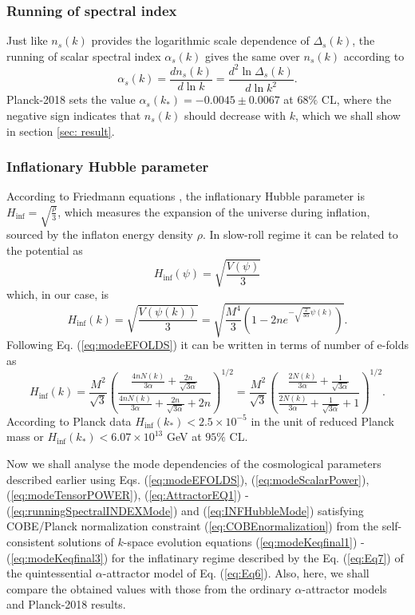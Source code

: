 \documentclass[a4paper,11pt]{article}
\begin{document}
\subsubsection{Running of spectral index}
Just like $n_s(k)$ provides the logarithmic scale dependence of $\Delta_s(k)$, the running of scalar spectral index $\alpha_s(k)$ gives the same over $n_s(k)$ according to
\begin{equation}
    \alpha_s(k) =\frac{dn_s(k)}{d\ln{k}}=\frac{d^2\ln{\Delta_s(k)}}{d\ln{k}^2}.
    \label{eq:runningSpectralINDEXMode}
\end{equation}
Planck-2018 sets the value $\alpha_s(k_{*})=-0.0045\pm 0.0067$ at $68\%$ CL, where the negative sign indicates that $n_s(k)$ should decrease with $k$, which we shall show in section \ref{sec: result}.
\subsubsection{Inflationary Hubble parameter}
According to Friedmann equations \cite{Baumann:2009ds}, the inflationary Hubble parameter is $H_{\mathrm{inf}}=\sqrt{\frac{\rho}{3}}$, which measures the expansion of the universe during inflation, sourced by the inflaton energy density $\rho$. In slow-roll regime it can be related to the potential as
\begin{equation}
    H_{\mathrm{inf}}(\psi) = \sqrt{\frac{V(\psi)}{3}}
\end{equation} which, in our case, is
\begin{equation}
   H_{\mathrm{inf}}(k) =\sqrt{\frac{V(\psi(k))}{3}}=\sqrt{\frac{M^4}{3}\left(1-2ne^{-\sqrt{\frac{2}{3\alpha}}\psi(k)}\right)}.
   \label{eq:DefHubbleINF}
\end{equation}
Following Eq. (\ref{eq:modeEFOLDS}) it can be written in terms of number of e-folds as
\begin{equation}
    H_{\mathrm{inf}}(k)=\frac{M^2}{\sqrt{3}}\left(\frac{\frac{4nN(k)}{3\alpha}+\frac{2n}{\sqrt{3\alpha}}}{\frac{4nN(k)}{3\alpha}+\frac{2n}{\sqrt{3\alpha}}+2n}\right)^{1/2}=\frac{M^2}{\sqrt{3}}\left(\frac{\frac{2N(k)}{3\alpha}+\frac{1}{\sqrt{3\alpha}}}{\frac{2N(k)}{3\alpha}+\frac{1}{\sqrt{3\alpha}}+1}\right)^{1/2}.
    \label{eq:INFHubbleMode}
\end{equation}
According to Planck data $H_{\mathrm{inf}}(k_{*})<2.5\times 10^{-5}$ in the unit of reduced Planck mass or $H_{\mathrm{inf}}(k_{*})<6.07\times 10^{13}$ GeV at $95\%$ CL.\par Now we shall analyse the mode dependencies of the cosmological parameters described earlier using Eqs. (\ref{eq:modeEFOLDS}), (\ref{eq:modeScalarPower}), (\ref{eq:modeTensorPOWER}), (\ref{eq:AttractorEQ1}) - (\ref{eq:runningSpectralINDEXMode}) and (\ref{eq:INFHubbleMode}) satisfying COBE/Planck normalization constraint (\ref{eq:COBEnormalization}) from the self-consistent solutions of $k$-space evolution equations (\ref{eq:modeKeqfinal1}) - (\ref{eq:modeKeqfinal3})  for the inflatinary regime described by the Eq. (\ref{eq:Eq7}) of the quintessential $\alpha$-attractor model of Eq. (\ref{eq:Eq6}). Also, here, we shall compare the obtained values with those from the ordinary $\alpha$-attractor models and Planck-2018 results.
\end{document}
